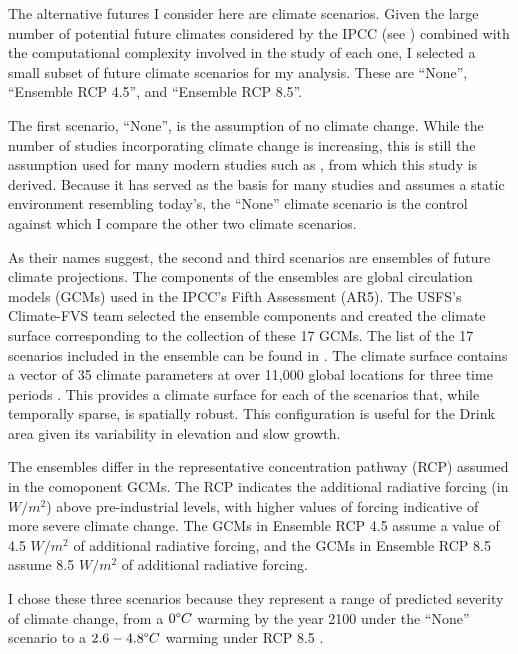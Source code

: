 The alternative futures I consider here are climate scenarios. Given the large number of potential future climates considered by the IPCC (see \cite{ipccListOfAR5Models}) combined with the computational complexity involved in the study of each one, I selected a small subset of  future climate scenarios for my analysis. These are ``None'', ``Ensemble RCP 4.5'', and ``Ensemble RCP 8.5''.

The first scenario, ``None'', is the assumption of no climate change. While the number of studies incorporating climate change is increasing, this is still the assumption used for many modern studies such as \cite{svetlanaDissertation2013}, from which this study is derived. Because it has served as the basis for many studies and assumes a static environment resembling today's, the ``None'' climate scenario is the control against which I compare the other two climate scenarios.

As their names suggest, the second and third scenarios are ensembles of future climate projections. The components of the ensembles are global circulation models (GCMs) used in the IPCC's Fifth Assessment (AR5). The USFS's Climate-FVS \cite{dixon2002essential} team selected the ensemble components and created the climate surface corresponding to the collection of these 17 GCMs. The list of the 17 scenarios included in the ensemble can be found in \cite{ClimateModelsInFVSEnsemble}. The climate surface contains a vector of 35 climate parameters at over 11,000 global locations for three time periods \cite{crookston2014climate}. This provides a climate surface for each of the scenarios that, while temporally sparse, is spatially robust. This configuration is useful for the Drink area given its variability in elevation and slow growth.

The ensembles differ in the representative concentration pathway (RCP) assumed in the comoponent GCMs. The RCP indicates the additional radiative forcing (in $W/m^2$) above pre-industrial levels, with higher values of forcing indicative of more severe climate change. The GCMs in Ensemble RCP 4.5 assume a value of 4.5 $W/m^2$ of additional radiative forcing, and the GCMs in Ensemble RCP 8.5 assume 8.5 $W/m^2$ of additional radiative forcing.

I chose these three scenarios because they represent a range of predicted severity of climate change, from a $0 \degree C$ warming by the year 2100 under the ``None'' scenario to a $2.6-4.8 \degree C$ warming under RCP 8.5 \cite{ipcc2013climate}.

